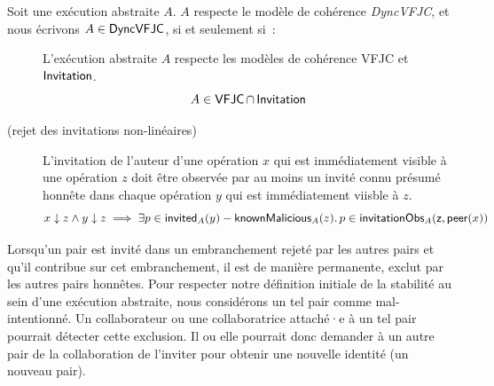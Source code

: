 \begin{definition}[DynVFJC]\label{def:svfjc-consistency}
Soit une exécution abstraite $A$. $A$ respecte le modèle de cohérence \emph{DyncVFJC}, et nous écrivons $A \in \operatorname{\mathsf{DyncVFJC}}$, si et seulement si~:
\begin{description}
  \item[]
  L'exécution abstraite $A$ respecte les modèles de cohérence \acs{VFJC} et $\operatorname{\mathsf{Invitation}}$.
  \begin{equation*}
    A \in \operatorname{\mathsf{VFJC}} \cap \operatorname{\mathsf{Invitation}}
  \end{equation*}
  
  \item[ (rejet des invitations non-linéaires)]
  L'invitation de l'auteur d'une opération $x$ qui est immédiatement visible à une opération $z$ doit être observée par au moins un invité connu présumé honnête dans chaque opération $y$ qui est immédiatement viisble à $z$.
  \begin{equation*}
      x \downarrow z \land y \downarrow z \implies \exists p \in \operatorname{\mathsf{invited}}_A(y) - \operatorname{\mathsf{knownMalicious}}_A(z) \ldotp p \in \operatorname{\mathsf{invitationObs}}_A(\operatorname{\mathsf{z, peer}}(x))
  \end{equation*}
  \end{description}
\end{definition}

Lorsqu'un pair est invité dans un embranchement rejeté par les autres pairs et qu'il contribue sur cet embranchement, il est de manière permanente, exclut par les autres pairs honnêtes.
Pour respecter notre définition initiale de la stabilité au sein d'une exécution abstraite, nous considérons un tel pair comme mal-intentionné.
Un collaborateur ou une collaboratrice attaché·e à un tel pair pourrait détecter cette exclusion.
Il ou elle pourrait donc demander à un autre pair de la collaboration de l'inviter pour obtenir une nouvelle identité (un nouveau pair).

